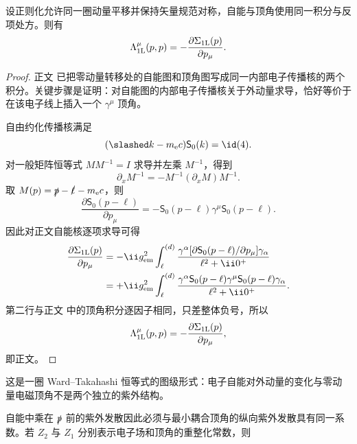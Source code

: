\begin{proposition}
设正则化允许同一圈动量平移并保持矢量规范对称，自能与顶角使用同一积分与反项处方。则有
\begin{equation}
{
\Lambda_{\rm 1L}^{\mu}(p,p)
=-\frac{\partial\Sigma_{\rm 1L}(p)}{\partial p_\mu}.}
\label{eq:qed-one-loop-ward-kernel-dp53}
\end{equation}
\end{proposition}
\begin{proof}
正文 已把零动量转移处的自能图和顶角图写成同一内部电子传播核的两个积分。关键步骤是证明：对自能图的内部电子传播核关于外动量求导，恰好等价于在该电子线上插入一个 \(\gamma^\mu\) 顶角。

自由约化传播核满足
\begin{equation*}
(\slashed k-m_{\mathrm e} c)\mathsf S_0(k)=\id(4).
\end{equation*}
对一般矩阵恒等式 \(M M^{-1}=I\) 求导并左乘 \(M^{-1}\)，得到
\begin{equation*}
\partial_xM^{-1}
=-M^{-1}(\partial_xM)M^{-1}.
\end{equation*}
取 \(M(p)=\slashed p-\slashed\ell-m_{\mathrm e} c\)，则
\begin{equation*}
\frac{\partial\mathsf S_0(p-\ell)}{\partial p_\mu}
=-\mathsf S_0(p-\ell)\gamma^\mu\mathsf S_0(p-\ell).
\end{equation*}
因此对正文自能核逐项求导可得
\begin{align*}
\frac{\partial\Sigma_{\rm 1L}(p)}{\partial p_\mu}
&=-\ii g_{\rm em}^2
\int_{\ell}^{(d)}
\frac{\gamma^\alpha
[\partial\mathsf S_0(p-\ell)/\partial p_\mu]
\gamma_\alpha}
{\ell^2+\ii0^+}\\
&=+\ii g_{\rm em}^2
\int_{\ell}^{(d)}
\frac{\gamma^\alpha\mathsf S_0(p-\ell)
\gamma^\mu\mathsf S_0(p-\ell)\gamma_\alpha}
{\ell^2+\ii0^+}.
\end{align*}
第二行与正文 中的顶角积分逐因子相同，只差整体负号，所以
\begin{equation*}
\Lambda_{\rm 1L}^{\mu}(p,p)
=-\frac{\partial\Sigma_{\rm 1L}(p)}{\partial p_\mu},
\end{equation*}
即正文。
\end{proof}

这是一圈 Ward--Takahashi 恒等式的图级形式：电子自能对外动量的变化与零动量电磁顶角不是两个独立的紫外结构。

自能中乘在 \(\slashed p\) 前的紫外发散因此必须与最小耦合顶角的纵向紫外发散具有同一系数。若 \(Z_2\) 与 \(Z_1\) 分别表示电子场和顶角的重整化常数，则



